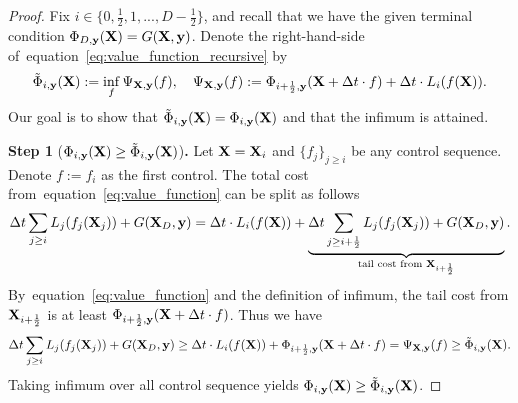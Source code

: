 \documentclass[10pt,a4paper]{amsart}
\newcommand{\bfX}{{\bf X}}
\newcommand{\bfy}{ {\bf y}}
\def\eqref#1{equation~\ref{#1}}
\begin{document}
\begin{proof}
    Fix $i \in \{ 0,\frac{1}{2},1,...,D-\frac{1}{2} \}$, and recall that we have the given terminal condition $\Phi_{D, \bfy}(\bfX) = G(\bfX, \bfy)$. Denote the right-hand-side of~\eqref{eq:value_function_recursive} by
    \begin{equation}\label{eq:value_function_recursive_psi}
        \tilde{\Phi}_{i, \bfy}(\bfX) := \inf_f \Psi_{\bfX, \bfy}(f), \quad \Psi_{\bfX, \bfy}(f) :=  \Phi_{i+\frac{1}{2}, \bfy}(\bfX + \Delta t \cdot f) + \Delta t \cdot L_i(f(\bfX)) .
    \end{equation}
    Our goal is to show that $\tilde{\Phi}_{i, \bfy}(\bfX) = {\Phi}_{i, \bfy}(\bfX)$ and that the infimum is attained.

    \textbf{Step 1} (${\Phi}_{i, \bfy}(\bfX) \geq \tilde{\Phi}_{i, \bfy}(\bfX)$)\textbf{.} Let $\bfX=\bfX_i$ and
    $\{ f_j\}_{j \geq i}$ be any control sequence.  Denote $f:=f_i$ as the first control. The total cost from~\eqref{eq:value_function} can be split as follows
    \begin{equation}
        \Delta t \sum_{j \geq i} L_j(f_j(\bfX_j)) + G(\bfX_D, \bfy)  = \Delta t \cdot L_i(f(\bfX)) + \underbrace{\Delta t \sum_{j \geq i+\frac{1}{2}} L_j(f_j(\bfX_j)) + G(\bfX_D, \bfy)}_{\text{tail cost from $\bfX_{i+\frac{1}{2}}$}}. 
    \end{equation}
    By~\eqref{eq:value_function} and the definition of infimum, the tail cost from $\bfX_{i+\frac{1}{2}}$ is at least $\Phi_{i+\frac{1}{2}, \bfy}(\bfX + \Delta t \cdot f)$. Thus we have
    \[
    \Delta t \sum_{j \geq i} L_j(f_j(\bfX_j)) + G(\bfX_D, \bfy) \geq \Delta t \cdot L_i(f(\bfX)) + \Phi_{i+\frac{1}{2}, \bfy}(\bfX + \Delta t \cdot f) = \Psi_{\bfX, \bfy}(f) \geq \tilde{\Phi}_{i, \bfy}(\bfX) .
    \]
    Taking infimum over all control sequence yields ${\Phi}_{i, \bfy}(\bfX) \geq \tilde{\Phi}_{i, \bfy}(\bfX)$.


\end{proof}
\end{document}
